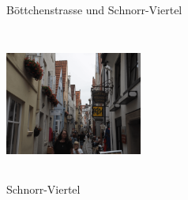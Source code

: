 \begin{figure}[t]
   \centering
   \quad
   \quad
   \quad
   \caption[Böttchenstrasse und Schnorr-Viertel]{Böttchenstrasse und Schnorr-Viertel}
\end{figure}


\begin{figure} 
  \begin{centering}
    \includegraphics[width=0.4\textwidth, height=5cm, keepaspectratio]{../Bilder/Sylt/21.png}
    \caption{Schnorr-Viertel}
  \end{centering}
\end{figure} 

